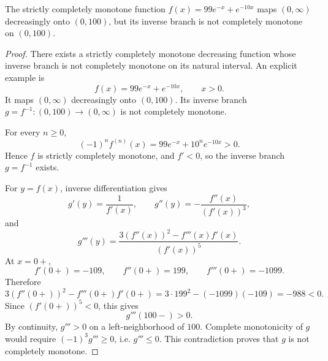 \begin{counterexample}
\label{res:keady-cm-inverse-not-cm-example}
The strictly completely monotone function \(f(x)=99e^{-x}+e^{-10x}\) maps \((0,\infty)\) decreasingly onto \((0,100)\), but its inverse branch is not completely monotone on \((0,100)\).
\end{counterexample}
\begin{proof}
There exists a strictly completely monotone decreasing function whose inverse branch is not completely monotone on its natural interval. An explicit example is
\[
f(x)=99e^{-x}+e^{-10x},\qquad x>0.
\]
It maps \((0,\infty)\) decreasingly onto \((0,100)\). Its inverse branch \(g=f^{-1}:(0,100)\to(0,\infty)\) is not completely monotone.

For every \(n\ge0\),
\[
(-1)^n f^{(n)}(x)=99e^{-x}+10^n e^{-10x}>0.
\]
Hence \(f\) is strictly completely monotone, and \(f'<0\), so the inverse branch \(g=f^{-1}\) exists.

For \(y=f(x)\), inverse differentiation gives
\[
g'(y)=\frac1{f'(x)},\qquad
g''(y)=-\frac{f''(x)}{(f'(x))^3},
\]
and
\[
g'''(y)=\frac{3(f''(x))^2-f'''(x)f'(x)}{(f'(x))^5}.
\]
At \(x=0+\),
\[
f'(0+)=-109,\qquad f''(0+)=199,\qquad f'''(0+)=-1099.
\]
Therefore
\[
3(f''(0+))^2-f'''(0+)f'(0+)
=3\cdot199^2-(-1099)(-109)
=-988<0.
\]
Since \((f'(0+))^5<0\), this gives
\[
g'''(100-)>0.
\]
By continuity, \(g'''>0\) on a left-neighborhood of \(100\). Complete monotonicity of \(g\) would require \((-1)^3g'''\ge0\), i.e. \(g'''\le0\). This contradiction proves that \(g\) is not completely monotone.
\end{proof}

